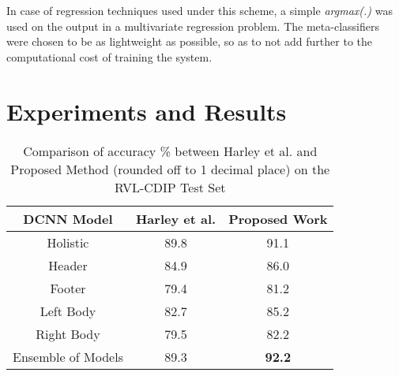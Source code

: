 \documentclass[10pt,conference,a4paper]{IEEEtran}
\begin{document}
In case of regression techniques used under this scheme, a simple \textit{argmax(.)} was used on the output in a multivariate regression problem. The meta-classifiers were chosen to be as lightweight as possible, so as to not add further to the computational cost of training the system.


	

\section{Experiments and Results}

\begin{table}[]
	\centering
	\caption{Comparison of accuracy \% between Harley et al. and Proposed Method (rounded off to 1 decimal place) on the RVL-CDIP Test Set}
	\label{Tab:RegionAccs}
	\begin{tabular}{|c|c|c|}
		\hline
		\textbf{DCNN Model} & \textbf{Harley et al.} & \textbf{Proposed Work} \\
		\hline \hline
		Holistic            & 89.8                   & 91.1                  \\
		Header              & 84.9                   & 86.0                  \\
		Footer              & 79.4                   & 81.2                  \\
		Left Body           & 82.7                   & 85.2                  \\
		Right Body          & 79.5                   & 82.2                  \\
		\hline
		Ensemble of Models  & 89.3                   & \textbf{92.2} \\
		\hline
	\end{tabular}
\end{table}
\end{document}
